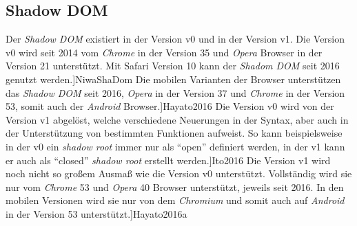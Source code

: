 \documentclass[12pt, paper=a4, bibtotoc, toc=listof, headsepline=true]{scrreprt}
\renewcommand{\smfootcite}[2][2]{\relax}
\begin{document}
		\subsection{Shadow DOM}
		Der \emph{Shadow \ac{DOM}} existiert in der Version v0 und in der Version v1. Die Version v0 wird seit 2014 vom \emph{Chrome} in der Version 35 und \emph{Opera} Browser in der Version 21 unterstützt. Mit Safari Version 10 kann der \emph{Shadom \ac{DOM}} seit 2016  genutzt werden.\smfootcite[ vgl.][]{NiwaShaDom} Die mobilen Varianten der Browser unterstützen das \emph{Shadow \ac{DOM}} seit 2016, \emph{Opera} in der Version 37 und \emph{Chrome} in der Version 53, somit auch der \emph{Android} Browser.\smfootcite[ vlg.][]{Hayato2016} Die Version v0 wird von der Version v1 abgelöst, welche verschiedene Neuerungen in der Syntax, aber auch in der Unterstützung von bestimmten Funktionen aufweist. So kann beispielsweise in der v0 ein \emph{shadow root} immer nur als \enquote{open} definiert werden, in der v1 kann er auch als \enquote{closed} \emph{shadow root} erstellt werden.\smfootcite[ vgl.][]{Ito2016}
		Die Version v1 wird noch nicht so großem Ausmaß wie die Version v0 unterstützt. Vollständig wird sie nur vom \emph{Chrome} 53 und \emph{Opera} 40 Browser unterstützt, jeweils seit 2016. In den mobilen Versionen wird sie nur von dem \emph{Chromium} und somit auch auf \emph{Android} in der Version 53 unterstützt.\smfootcite[ vlg.][]{Hayato2016a}
\end{document}
